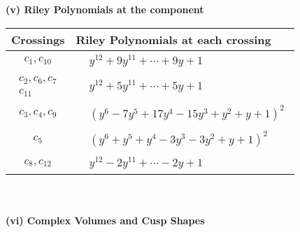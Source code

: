 \documentclass[1p]{elsarticle_modified}
\theoremstyle{definition}
\begin{document}
\flushleft \textbf{(v) Riley Polynomials at the component}\newline \\
\begin{tabular}{m{50pt}|m{274pt}}
Crossings & \hspace{64pt}Riley Polynomials at each crossing \\
\hline $$\begin{aligned}c_{1},c_{10}\end{aligned}$$&$\begin{aligned}
&y^{12}+9 y^{11}+\cdots+9 y+1
\end{aligned}$\\
\hline $$\begin{aligned}c_{2},c_{6},c_{7}\\c_{11}\end{aligned}$$&$\begin{aligned}
&y^{12}+5 y^{11}+\cdots+5 y+1
\end{aligned}$\\
\hline $$\begin{aligned}c_{3},c_{4},c_{9}\end{aligned}$$&$\begin{aligned}
&(y^6-7 y^5+17 y^4-15 y^3+y^2+y+1)^2
\end{aligned}$\\
\hline $$\begin{aligned}c_{5}\end{aligned}$$&$\begin{aligned}
&(y^6+y^5+y^4-3 y^3-3 y^2+y+1)^2
\end{aligned}$\\
\hline $$\begin{aligned}c_{8},c_{12}\end{aligned}$$&$\begin{aligned}
&y^{12}-2 y^{11}+\cdots-2 y+1
\end{aligned}$\\
\hline
\end{tabular}\\~\\
\newpage\flushleft \textbf{(vi) Complex Volumes and Cusp Shapes}
\end{document}
